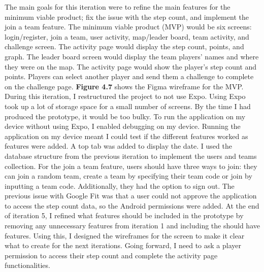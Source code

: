 \documentclass{l4proj}
\begin{document}
The main goals for this iteration were to refine the main features for the minimum viable product; fix the issue with the step count, and implement the join a team feature. 
The minimum viable product (MVP) would be six screens: login/register, join a team, user activity, map/leader board, team activity, and challenge screen. The activity page would display the step count, points, and graph. The leader board screen would display the team players' names and where they were on the map. The activity page would show the player's step count and points. Players can select another player and send them a challenge to complete on the challenge page. \textbf{Figure 4.7} shows the Figma wireframe for the MVP.  
During this iteration, I restructured the project to not use Expo. Using Expo took up a lot of storage space for a small number of screens. By the time I had produced the prototype, it would be too bulky. To run the application on my device without using Expo, I enabled debugging on my device. Running the application on my device meant I could test if the different features worked as features were added. A top tab was added to display the date. I used the database structure from the previous iteration to implement the users and teams collection. For the join a team feature, users should have three ways to join: they can join a random team, create a team by specifying their team code or join by inputting a team code. Additionally, they had the option to sign out. The previous issue with Google Fit was that a user could not approve the application to access the step count data, so the Android permissions were added. 
At the end of iteration 5, I refined what features should be included in the prototype by removing any unnecessary features from iteration 1 and including the should have features. Using this, I designed the wireframes for the screen to make it clear what to create for the next iterations. Going forward, I need to ask a player permission to access their step count and complete the activity page functionalities. 
\end{document}
